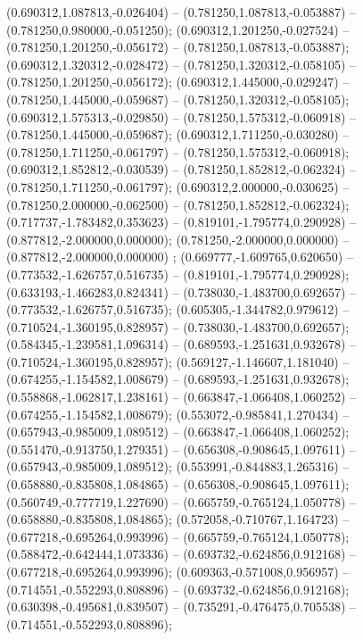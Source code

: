  (0.690312,1.087813,-0.026404) -- (0.781250,1.087813,-0.053887) -- (0.781250,0.980000,-0.051250);
 (0.690312,1.201250,-0.027524) -- (0.781250,1.201250,-0.056172) -- (0.781250,1.087813,-0.053887);
 (0.690312,1.320312,-0.028472) -- (0.781250,1.320312,-0.058105) -- (0.781250,1.201250,-0.056172);
 (0.690312,1.445000,-0.029247) -- (0.781250,1.445000,-0.059687) -- (0.781250,1.320312,-0.058105);
 (0.690312,1.575313,-0.029850) -- (0.781250,1.575312,-0.060918) -- (0.781250,1.445000,-0.059687);
 (0.690312,1.711250,-0.030280) -- (0.781250,1.711250,-0.061797) -- (0.781250,1.575312,-0.060918);
 (0.690312,1.852812,-0.030539) -- (0.781250,1.852812,-0.062324) -- (0.781250,1.711250,-0.061797);
 (0.690312,2.000000,-0.030625) -- (0.781250,2.000000,-0.062500) -- (0.781250,1.852812,-0.062324);
 (0.717737,-1.783482,0.353623) -- (0.819101,-1.795774,0.290928) -- (0.877812,-2.000000,0.000000);
 (0.781250,-2.000000,0.000000) -- (0.877812,-2.000000,0.000000) ;
 (0.669777,-1.609765,0.620650) -- (0.773532,-1.626757,0.516735) -- (0.819101,-1.795774,0.290928);
 (0.633193,-1.466283,0.824341) -- (0.738030,-1.483700,0.692657) -- (0.773532,-1.626757,0.516735);
 (0.605305,-1.344782,0.979612) -- (0.710524,-1.360195,0.828957) -- (0.738030,-1.483700,0.692657);
 (0.584345,-1.239581,1.096314) -- (0.689593,-1.251631,0.932678) -- (0.710524,-1.360195,0.828957);
 (0.569127,-1.146607,1.181040) -- (0.674255,-1.154582,1.008679) -- (0.689593,-1.251631,0.932678);
 (0.558868,-1.062817,1.238161) -- (0.663847,-1.066408,1.060252) -- (0.674255,-1.154582,1.008679);
 (0.553072,-0.985841,1.270434) -- (0.657943,-0.985009,1.089512) -- (0.663847,-1.066408,1.060252);
 (0.551470,-0.913750,1.279351) -- (0.656308,-0.908645,1.097611) -- (0.657943,-0.985009,1.089512);
 (0.553991,-0.844883,1.265316) -- (0.658880,-0.835808,1.084865) -- (0.656308,-0.908645,1.097611);
 (0.560749,-0.777719,1.227690) -- (0.665759,-0.765124,1.050778) -- (0.658880,-0.835808,1.084865);
 (0.572058,-0.710767,1.164723) -- (0.677218,-0.695264,0.993996) -- (0.665759,-0.765124,1.050778);
 (0.588472,-0.642444,1.073336) -- (0.693732,-0.624856,0.912168) -- (0.677218,-0.695264,0.993996);
 (0.609363,-0.571008,0.956957) -- (0.714551,-0.552293,0.808896) -- (0.693732,-0.624856,0.912168);
 (0.630398,-0.495681,0.839507) -- (0.735291,-0.476475,0.705538) -- (0.714551,-0.552293,0.808896);
